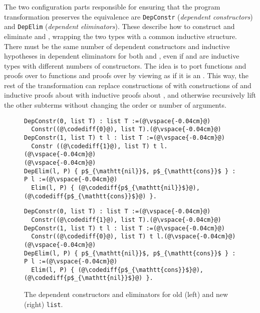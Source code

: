 The two configuration parts responsible for ensuring that the program transformation preserves the 
equivalence are \lstinline{DepConstr} (\textit{dependent constructors}) 
and \lstinline{DepElim} (\textit{dependent eliminators}).
These describe how to construct and eliminate \A and \B, wrapping the two types with a common inductive structure.
There must be the same number of dependent constructors and inductive hypotheses in dependent eliminators for both \A and \B,
even if \A and \B are inductive types with different numbers of constructors.
The idea is to port functions and proofs over \A to functions and proofs over \B by viewing \B as if it is an \A.
This way, the rest of the transformation can replace constructions of \A with constructions of \B and
inductive proofs about \A with inductive proofs about \B, and otherwise recursively lift
the other subterms without changing the order or number of arguments.

\begin{figure}
\begin{minipage}{0.48\textwidth}
\begin{lstlisting}
DepConstr(0, list T) : list T :=(@\vspace{-0.04cm}@)
  Constr((@\codediff{0}@), list T).(@\vspace{-0.04cm}@)
DepConstr(1, list T) t l : list T :=(@\vspace{-0.04cm}@)
  Constr ((@\codediff{1}@), list T) t l.(@\vspace{-0.04cm}@)
(@\vspace{-0.04cm}@)
DepElim(l, P) { p$_{\mathtt{nil}}$, p$_{\mathtt{cons}}$ } : P l :=(@\vspace{-0.04cm}@)
  Elim(l, P) { (@\codediff{p$_{\mathtt{nil}}$}@), (@\codediff{p$_{\mathtt{cons}}$}@) }.
\end{lstlisting}
\end{minipage}
\hfill
\begin{minipage}{0.48\textwidth}
\begin{lstlisting}
DepConstr(0, list T) : list T :=(@\vspace{-0.04cm}@)
  Constr((@\codediff{1}@), list T).(@\vspace{-0.04cm}@)
DepConstr(1, list T) t l : list T :=(@\vspace{-0.04cm}@)
  Constr((@\codediff{0}@), list T) t l.(@\vspace{-0.04cm}@)
(@\vspace{-0.04cm}@)
DepElim(l, P) { p$_{\mathtt{nil}}$, p$_{\mathtt{cons}}$ } : P l :=(@\vspace{-0.04cm}@)
  Elim(l, P) { (@\codediff{p$_{\mathtt{cons}}$}@), (@\codediff{p$_{\mathtt{nil}}$}@) }.
\end{lstlisting}
\end{minipage}
\vspace{-0.2cm}
\caption{The dependent constructors and eliminators for old (left) and new (right) \lstinline{list}.}
\label{fig:listconfig}
\end{figure}

